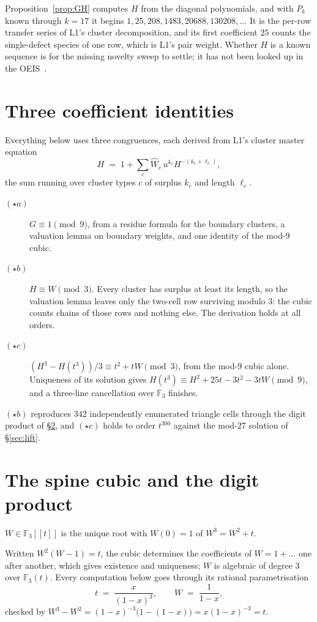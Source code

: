 \documentclass[11pt]{article}
\newcommand{\F}{\mathbb{F}}
\begin{document}
Proposition~\ref{prop:GH} computes $H$ from the diagonal polynomials, and with
$P_k$ known through $k = 17$ it begins $1, 25, 208, 1483, 20688, 130208, \dots$
It is the per-row transfer series of L1's cluster decomposition, and its first
coefficient $25$ counts the single-defect species of one row, which is L1's pair
weight. Whether $H$ is a known sequence is for the missing novelty sweep
to settle; it has not been looked up in the OEIS~\cite{oeis}.

\section{Three coefficient identities}
\label{sec:ladder}

Everything below uses three congruences, each derived from L1's cluster master
equation
\[
  H \;=\; 1 + \sum_c \widehat W_c\, u^{k_c} H^{-(k_c+\ell_c)} ,
\]
the sum running over cluster types $c$ of surplus $k_c$ and length $\ell_c$.

\begin{description}
\item[$(\star a)$] $G \equiv 1 \pmod 9$, from a residue formula for the boundary
  clusters, a valuation lemma on boundary weights, and one identity of the
  mod-$9$ cubic.
\item[$(\star b)$] $H \equiv W \pmod 3$. Every cluster has surplus at least its
  length, so the valuation lemma leaves only the two-cell row surviving modulo
  $3$: the cubic counts chains of those rows and nothing else. The derivation
  holds at all orders.
\item[$(\star c)$] $(H^3 - H(t^3))/3 \equiv t^2 + tW \pmod 3$, from the mod-$9$
  cubic alone. Uniqueness of its solution gives
  $H(t^3) \equiv H^2 + 25t - 3t^2 - 3tW \pmod 9$, and a three-line cancellation
  over $\F_3$ finishes.
\end{description}

$(\star b)$ reproduces $342$ independently enumerated triangle cells through the
digit product of \S\ref{sec:cubic}, and $(\star c)$ holds to order $t^{300}$
against the mod-$27$ solution of \S\ref{sec:lift}.

\section{The spine cubic and the digit product}
\label{sec:cubic}

\begin{definition}
$W \in \F_3[[t]]$ is the unique root with $W(0) = 1$ of $W^3 = W^2 + t$.
\end{definition}
Written $W^2(W-1) = t$, the cubic determines the coefficients of
$W = 1 + \dots$ one after another, which gives existence and uniqueness; $W$ is
algebraic of degree $3$ over $\F_3(t)$. Every computation below goes through its
rational parametrisation
\begin{equation}
  t \;=\; \frac{x}{(1-x)^3},
  \qquad
  W \;=\; \frac{1}{1-x} ,
  \label{eq:param}
\end{equation}
checked by $W^3 - W^2 = (1-x)^{-3}\bigl(1 - (1-x)\bigr) = x(1-x)^{-3} = t$.
\end{document}
